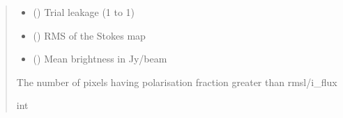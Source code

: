 \documentclass[letterpaper,10pt,english]{sphinxmanual}
\begin{document}
\begin{fulllineitems}
\begin{fulllineitems}
\begin{quote}
\begin{description}
\begin{itemize}
\item {} 
\sphinxAtStartPar
{} () \textendash{} Trial leakage (\sphinxhyphen{}1 to 1)

\item {} 
\sphinxAtStartPar
{} () \textendash{} RMS of the Stokes map

\item {} 
\sphinxAtStartPar
{} () \textendash{} Mean brightness in Jy/beam

\end{itemize}

\item[{Returns}] \leavevmode
\sphinxAtStartPar
The number of pixels having polarisation fraction greater than rmsl/i\_flux

\item[{Return type}] \leavevmode
\sphinxAtStartPar
int

\end{description}\end{quote}

\end{fulllineitems}



\end{fulllineitems}
\end{document}
